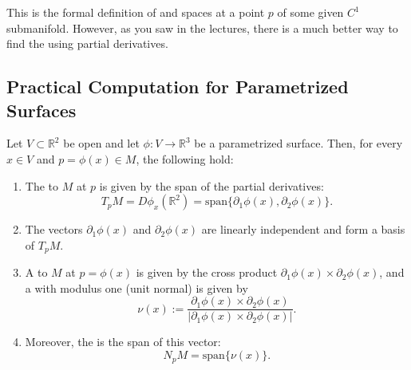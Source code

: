 This is the formal definition of  and  spaces at a point $p$ of some given $C^1$ submanifold. However, as you saw in the lectures, there is a much better way to find the  using partial derivatives.

\subsection{Practical Computation for Parametrized Surfaces}

\setcounter{savedSec}{\value{section}}
\setcounter{savedThm}{\value{theorem}}
\setcounter{section}{12}
\setcounter{theorem}{15}

\begin{theorem} %
Let $V \subset \mathbb{R}^2$ be open and let $\phi : V \to \mathbb{R}^3$ be a parametrized surface. Then, for every $x \in V$ and $p = \phi(x) \in M$, the following hold: %
\begin{enumerate}
    \item The  to $M$ at $p$ is given by the span of the partial derivatives:
    \[
    T_pM = D\phi_x(\mathbb{R}^2) = \text{span}\{\partial_1\phi(x), \partial_2\phi(x)\}. %
    \]
    \item The vectors $\partial_1\phi(x)$ and $\partial_2\phi(x)$ are linearly independent and form a basis of $T_pM$. %
    \item A  to $M$ at $p = \phi(x)$ is given by the cross product $\partial_1\phi(x) \times \partial_2\phi(x)$, and a  with modulus one (unit normal) is given by %
    \[
    \nu(x) := \frac{\partial_1\phi(x) \times \partial_2\phi(x)}{|\partial_1\phi(x) \times \partial_2\phi(x)|}. %
    \]
    \item Moreover, the  is the span of this vector:
    \[
    N_pM = \text{span}\{\nu(x)\}. %
    \]
\end{enumerate}
\end{theorem}

\setcounter{section}{\value{savedSec}}
\setcounter{theorem}{\value{savedThm}}

